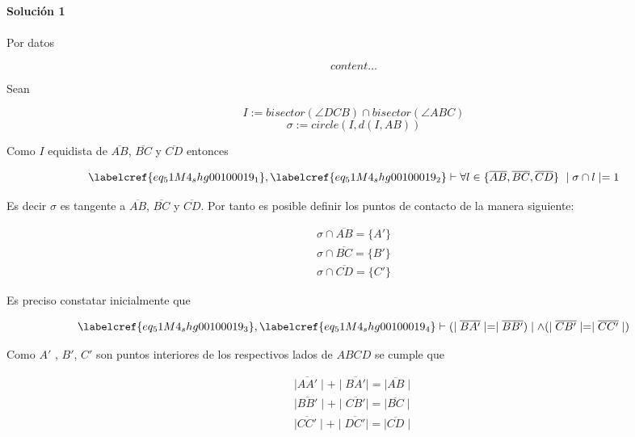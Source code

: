 
\noindent\textbf{Solución 1}\\\\

Por datos 

\begin{equation}
	content...
\end{equation}

Sean

\begin{equation} \label{eq_51M4_shg00100019_1}
	I := bisector(\angle DCB) \cap bisector(\angle ABC)
\end{equation}
\begin{equation} \label{eq_51M4_shg00100019_2}
	\sigma := circle(I, d(I, AB))
\end{equation}

Como $I$ equidista de $\overline{AB}$, $\overline{BC}$ y $\overline{CD}$ entonces 

\begin{equation} \label{eq_51M4_shg00100019_3}
	\labelcref{eq_51M4_shg00100019_1}, \labelcref{eq_51M4_shg00100019_2} \vdash \forall l \in \{\overline{AB}, \overline{BC}, \overline{CD} \}\ \mid \sigma \cap l \mid = 1
\end{equation}

Es decir $\sigma$ es tangente a $\overline{AB}$, $\overline{BC}$ y $\overline{CD}$. Por tanto es posible definir los puntos de contacto de la manera siguiente:

\begin{equation} \label{eq_51M4_shg00100019_4}
\begin{gathered}
	\sigma \cap \overline{AB} = \{A'\} \\
	\sigma \cap \overline{BC} = \{B'\} \\
	\sigma \cap \overline{CD} = \{C'\}
\end{gathered}
\end{equation}

Es preciso constatar inicialmente que 

\begin{equation} \label{eq_51M4_shg00100019_5}
	\labelcref{eq_51M4_shg00100019_3}, \labelcref{eq_51M4_shg00100019_4} \vdash (\mid\overline{BA'}\mid = \mid\overline{BB'})\mid \land (\mid\overline{CB'}\mid = \mid\overline{CC'}\mid)
\end{equation}

Como $A'$ , $B'$, $C'$ son puntos interiores de los respectivos lados de $ABCD$ se cumple que

\begin{equation} \label{eq_51M4_shg00100019_6}
\begin{gathered}
	\mid\overline{AA'}\mid + \mid\overline{BA'}\mid = \mid\overline{AB}\mid \\
	\mid\overline{BB'}\mid + \mid\overline{CB'}\mid = \mid\overline{BC}\mid \\
	\mid\overline{CC'}\mid + \mid\overline{DC'}\mid = \mid\overline{CD}\mid
\end{gathered}
\end{equation}

